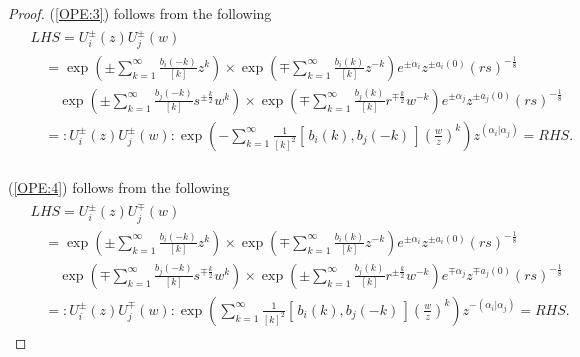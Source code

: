 \documentclass{amsproc}
\theoremstyle{remark}
\numberwithin{equation}{section}
\begin{document}
\begin{proof}
(\ref{OPE:3}) follows from the following
\begin{eqnarray*}
\begin{split}
&LHS=U_i^{\pm}(z)U_j^{\pm}(w)\\
&\quad=\exp (\pm  \sum^{\infty}_{k=1}
                 \frac{b_i(-k)}{[k]} z^k)\times\exp ( \mp \sum^{\infty}_{k=1}
           \frac{b_i(k)   }{[k]} z^{-k})
         e^{\pm{\alpha}_i} z^{\pm a_i(0)}(rs)^{-\frac{1}{8}} \\
&\qquad\exp (\pm  \sum^{\infty}_{k=1}
                 \frac{b_j(-k)}{[k]} s^{\pm\frac{k}{2}} w^k)\times\exp ( \mp \sum^{\infty}_{k=1}
           \frac{b_j(k)   }{[k]} r^{\mp \frac{k}{2}} w^{-k})
         e^{\pm{\alpha}_j} z^{\pm a_j(0)}(rs)^{-\frac{1}{8}} \\
&\quad=:U_i^{\pm}(z)U_j^{\pm}(w):\exp (-\sum^{\infty}_{k=1}
           \frac{1}{[k]^2}[\,b_i(k), b_j(-k)\,] (\frac{w}{z})^{k})z^{(\alpha_i|\alpha_j)}=RHS.\\
\end{split}
\end{eqnarray*}

(\ref{OPE:4}) follows from the following
\begin{eqnarray*}
\begin{split}
&LHS=U_i^{\pm}(z)U_j^{\mp}(w)\\
&\quad=\exp (\pm  \sum^{\infty}_{k=1}
                 \frac{b_i(-k)}{[k]} z^k)\times\exp ( \mp \sum^{\infty}_{k=1}
           \frac{b_i(k)   }{[k]} z^{-k})
         e^{\pm{\alpha}_i} z^{\pm a_i(0)}(rs)^{-\frac{1}{8}} \\
&\qquad\exp (\mp  \sum^{\infty}_{k=1}
                 \frac{b_j(-k)}{[k]} s^{\mp\frac{k}{2}} w^k)\times\exp ( \pm \sum^{\infty}_{k=1}
           \frac{b_j(k)   }{[k]} r^{\pm \frac{k}{2}} w^{-k})
         e^{\mp{\alpha}_j} z^{\mp a_j(0)}(rs)^{-\frac{1}{8}} \\
&\quad=:U_i^{\pm}(z)U_j^{\mp}(w):\exp (\sum^{\infty}_{k=1}
           \frac{1}{[k]^2}[\,b_i(k), b_j(-k)\,] (\frac{w}{z})^{k})z^{-(\alpha_i|\alpha_j)}=RHS.
\end{split}
\end{eqnarray*}
\end{proof}
\end{document}

